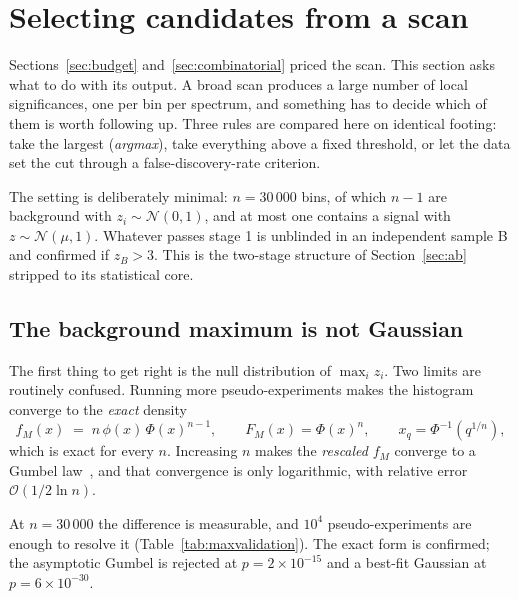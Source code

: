 \section{Selecting candidates from a scan}
\label{sec:selection}

Sections~\ref{sec:budget} and~\ref{sec:combinatorial} priced the scan. This section asks what to
do with its output. A broad scan produces a large number of local significances, one per bin per
spectrum, and something has to decide which of them is worth following up. Three rules are
compared here on identical footing: take the largest (\emph{argmax}), take everything above a
fixed threshold, or let the data set the cut through a false-discovery-rate criterion.

The setting is deliberately minimal: $n = 30\,000$ bins, of which $n-1$ are background with $z_i
\sim \mathcal{N}(0,1)$, and at most one contains a signal with $z \sim \mathcal{N}(\mu, 1)$.
Whatever passes stage 1 is unblinded in an independent sample B and confirmed if $z_B > 3$. This
is the two-stage structure of Section~\ref{sec:ab} stripped to its statistical core.

\subsection{The background maximum is not Gaussian}

The first thing to get right is the null distribution of $\max_i z_i$. Two limits are routinely
confused. Running more pseudo-experiments makes the histogram converge to the \emph{exact} density
\begin{equation}
  f_M(x) \;=\; n\,\phi(x)\,\Phi(x)^{n-1},
  \qquad
  F_M(x) = \Phi(x)^n,
  \qquad
  x_q = \Phi^{-1}\!\left(q^{1/n}\right),
  \label{eq:maxexact}
\end{equation}
which is exact for every $n$. Increasing $n$ makes the \emph{rescaled} $f_M$ converge to a Gumbel
law~\cite{fishertippett,gumbel}, and that convergence is only logarithmic, with relative error
$\mathcal{O}(1/2\ln n)$.

At $n = 30\,000$ the difference is measurable, and $10^4$ pseudo-experiments are enough to resolve
it (Table~\ref{tab:maxvalidation}). The exact form is confirmed; the asymptotic Gumbel is rejected
at $p = 2\times10^{-15}$ and a best-fit Gaussian at $p = 6\times10^{-30}$.

